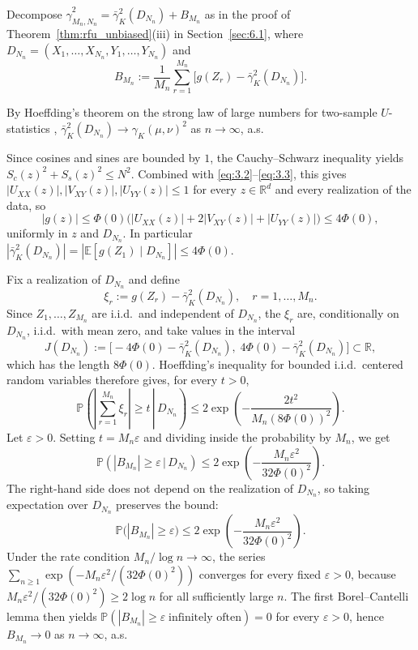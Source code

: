 \documentclass[11pt,leqno]{article}
\theoremstyle{plain}
\theoremstyle{remark}
\theoremstyle{definition}
\numberwithin{equation}{section}
\numberwithin{figure}{section}
\numberwithin{table}{section}
\numberwithin{algorithm}{section}
\newcommand{\EE}{\mathbb{E}}
\newcommand{\RR}{\mathbb{R}}
\begin{document}
Decompose $\hat{\gamma}_{M_n,N_n}^2 = \bar{\gamma}_K^2(D_{N_n}) + B_{M_n}$
as in the proof of Theorem~\ref{thm:rfu_unbiased}(iii) in Section~\ref{sec:6.1},
where $D_{N_n}=(X_1,\ldots,X_{N_n},Y_1,\ldots,Y_{N_n})$ and
\[
 B_{M_n} := \frac{1}{M_n}\sum_{r=1}^{M_n}\bigl[g(Z_r) - \bar{\gamma}_K^2(D_{N_n})\bigr].
\]

By Hoeffding's theorem on the strong law of large numbers for two-sample $U$-statistics
\cite[Section~5.4]{ser:1980},
$\bar{\gamma}_K^2(D_{N_n})\to \gamma_K(\mu,\nu)^2$ as $n\to\infty$, a.s.

Since cosines and sines are bounded by $1$, the Cauchy--Schwarz inequality
yields $S_c(z)^2+S_s(z)^2\le N^2$.
Combined with \eqref{eq:3.2}--\eqref{eq:3.3}, this gives $|U_{XX}(z)|, |V_{XY}(z)|, |U_{YY}(z)|\le 1$ for every $z\in\RR^d$ and every realization of the data,
so
\[
 |g(z)| \le \Phi(0)\bigl(|U_{XX}(z)|+2|V_{XY}(z)|+|U_{YY}(z)|\bigr)\le 4\Phi(0),
\]
uniformly in $z$ and $D_{N_n}$.
In particular $|\bar{\gamma}_K^2(D_{N_n})| = |\EE[g(Z_1)\mid D_{N_n}]|\le 4\Phi(0)$.

Fix a realization of $D_{N_n}$ and define
\[
 \xi_r := g(Z_r) - \bar{\gamma}_K^2(D_{N_n}), \quad r=1,\ldots,M_n.
\]
Since $Z_1,\ldots,Z_{M_n}$ are i.i.d.\ and independent of $D_{N_n}$,
the $\xi_r$ are, conditionally on $D_{N_n}$, i.i.d.\ with mean zero,
and take values in the interval
\[
 J(D_{N_n}) := \bigl[-4\Phi(0)-\bar{\gamma}_K^2(D_{N_n}),\;4\Phi(0)-\bar{\gamma}_K^2(D_{N_n})\bigr]\subset \RR,
\]
which has the length $8\Phi(0)$.
Hoeffding's inequality \cite[Theorem~2]{hoe:1963} for bounded i.i.d.\ centered random variables therefore gives,
for every $t>0$,
\[
 \mathbb{P}\left(\left.\left|\sum_{r=1}^{M_n}\xi_r\right|\ge t \,\right|\, D_{N_n}\right)
 \le 2\exp\left(-\frac{2 t^2}{M_n(8\Phi(0))^2}\right).
\]
Let $\varepsilon>0$. Setting $t=M_n\varepsilon$ and dividing inside the probability by $M_n$, we get
\[
 \mathbb{P}\left(|B_{M_n}|\ge\varepsilon \,|\, D_{N_n}\right)
 \le 2\exp\left(-\frac{M_n\varepsilon^2}{32\Phi(0)^2}\right).
\]
The right-hand side does not depend on the realization of $D_{N_n}$, so taking expectation over $D_{N_n}$ preserves the bound:
\begin{equation}\label{eq:6.lemmaHoef}
 \mathbb{P}\bigl(|B_{M_n}|\ge\varepsilon\bigr) \le 2\exp\left(-\frac{M_n\varepsilon^2}{32\Phi(0)^2}\right).
\end{equation}
Under the rate condition $M_n/\log n\to\infty$,
the series $\sum_{n\ge 1}\exp(-M_n\varepsilon^2/(32\Phi(0)^2))$ converges for every fixed $\varepsilon>0$,
because $M_n\varepsilon^2/(32\Phi(0)^2)\ge 2\log n$ for all sufficiently large $n$.
The first Borel--Cantelli lemma then yields
$\mathbb{P}(|B_{M_n}|\ge\varepsilon\;\text{infinitely often})=0$
for every $\varepsilon>0$,
hence $B_{M_n}\to 0$ as $n\to\infty$, a.s.
\end{document}
